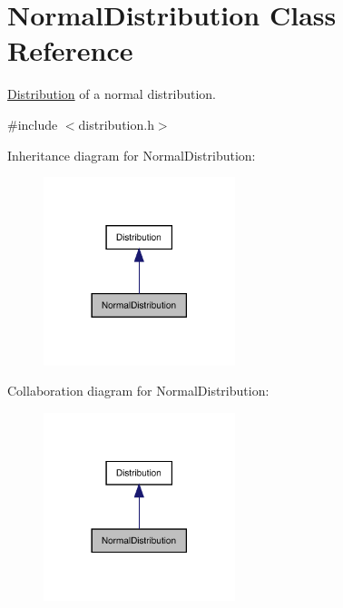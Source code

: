 \hypertarget{class_normal_distribution}{}\section{Normal\+Distribution Class Reference}
\label{class_normal_distribution}


\mbox{\hyperlink{class_distribution}{Distribution}} of a normal distribution.  




{\ttfamily \#include $<$distribution.\+h$>$}



Inheritance diagram for Normal\+Distribution\+:
\nopagebreak
\begin{figure}[H]
\begin{center}
\leavevmode
\includegraphics[width=158pt]{class_normal_distribution__inherit__graph}
\end{center}
\end{figure}


Collaboration diagram for Normal\+Distribution\+:
\nopagebreak
\begin{figure}[H]
\begin{center}
\leavevmode
\includegraphics[width=158pt]{class_normal_distribution__coll__graph}
\end{center}
\end{figure}

